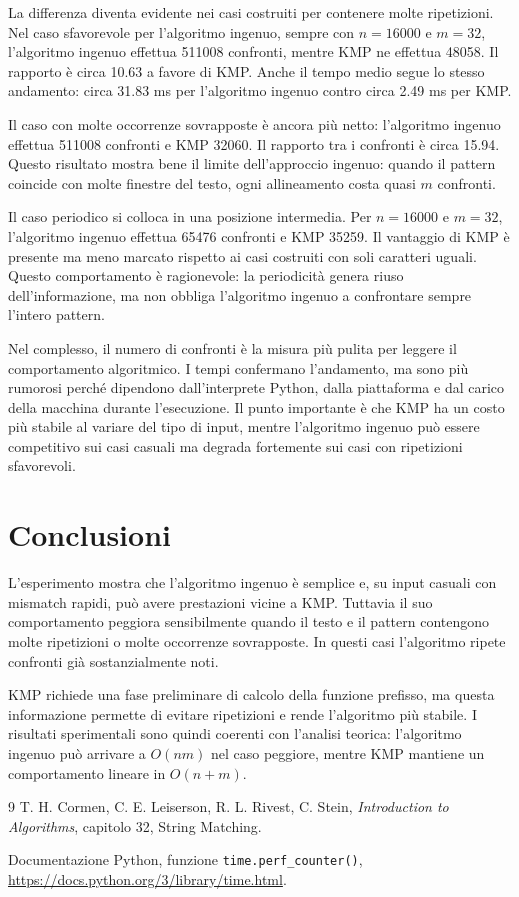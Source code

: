 \documentclass{article}
\begin{document}
La differenza diventa evidente nei casi costruiti per contenere molte ripetizioni. Nel caso sfavorevole per l'algoritmo ingenuo, sempre con $n=16000$ e $m=32$, l'algoritmo ingenuo effettua 511008 confronti, mentre KMP ne effettua 48058. Il rapporto è circa 10.63 a favore di KMP. Anche il tempo medio segue lo stesso andamento: circa 31.83 ms per l'algoritmo ingenuo contro circa 2.49 ms per KMP.

Il caso con molte occorrenze sovrapposte è ancora più netto: l'algoritmo ingenuo effettua 511008 confronti e KMP 32060. Il rapporto tra i confronti è circa 15.94. Questo risultato mostra bene il limite dell'approccio ingenuo: quando il pattern coincide con molte finestre del testo, ogni allineamento costa quasi $m$ confronti.

Il caso periodico si colloca in una posizione intermedia. Per $n=16000$ e $m=32$, l'algoritmo ingenuo effettua 65476 confronti e KMP 35259. Il vantaggio di KMP è presente ma meno marcato rispetto ai casi costruiti con soli caratteri uguali. Questo comportamento è ragionevole: la periodicità genera riuso dell'informazione, ma non obbliga l'algoritmo ingenuo a confrontare sempre l'intero pattern.

Nel complesso, il numero di confronti è la misura più pulita per leggere il comportamento algoritmico. I tempi confermano l'andamento, ma sono più rumorosi perché dipendono dall'interprete Python, dalla piattaforma e dal carico della macchina durante l'esecuzione. Il punto importante è che KMP ha un costo più stabile al variare del tipo di input, mentre l'algoritmo ingenuo può essere competitivo sui casi casuali ma degrada fortemente sui casi con ripetizioni sfavorevoli.

\section{Conclusioni}
L'esperimento mostra che l'algoritmo ingenuo è semplice e, su input casuali con mismatch rapidi, può avere prestazioni vicine a KMP. Tuttavia il suo comportamento peggiora sensibilmente quando il testo e il pattern contengono molte ripetizioni o molte occorrenze sovrapposte. In questi casi l'algoritmo ripete confronti già sostanzialmente noti.

KMP richiede una fase preliminare di calcolo della funzione prefisso, ma questa informazione permette di evitare ripetizioni e rende l'algoritmo più stabile. I risultati sperimentali sono quindi coerenti con l'analisi teorica: l'algoritmo ingenuo può arrivare a $O(nm)$ nel caso peggiore, mentre KMP mantiene un comportamento lineare in $O(n+m)$.

\begin{thebibliography}{9}
T. H. Cormen, C. E. Leiserson, R. L. Rivest, C. Stein, \emph{Introduction to Algorithms}, capitolo 32, String Matching.

Documentazione Python, funzione \texttt{time.perf\_counter()}, \url{https://docs.python.org/3/library/time.html}.
\end{thebibliography}
\end{document}
